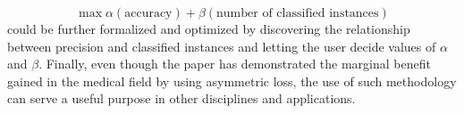 \documentclass[twoside,11pt]{article}
\begin{document}
 \begin{equation}
 \max \alpha(\text{accuracy}) + \beta(\text{number of classified instances})
 \end{equation}
could be further formalized and optimized by discovering the relationship between precision and classified instances and letting the user decide values of $\alpha$ and $\beta$. Finally, even though the paper has demonstrated the marginal benefit gained in the medical field by using asymmetric loss, the use of such methodology can serve a useful purpose in other disciplines and applications.


\end{document}

